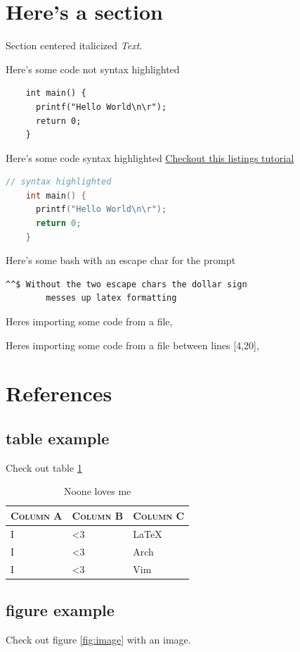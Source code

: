\documentclass[oneside,english,chapters]{smireport}
\providecommand{\tabularnewline}{\\}
\begin{document}
\section{Here's a section}
\begin{center}Section centered italicized \textit{Text}.\end{center}
Here's some code not syntax highlighted
\begin{verbatim}
    int main() {
      printf("Hello World\n\r");
      return 0;
    }
\end{verbatim}
Here's some code syntax highlighted
\href{https://www.overleaf.com/learn/latex/Code\_listing}{Checkout this listings tutorial}
\begin{lstlisting}[language=C]
    // syntax highlighted
    int main() {
      printf("Hello World\n\r");
      return 0;
    }
\end{lstlisting}
Here's some bash with an escape char for the prompt
\begin{lstlisting}[language=bash, escapechar=^]
    ^^$ Without the two escape chars the dollar sign
        messes up latex formatting
\end{lstlisting}
Heres importing some code from a file,

Heres importing some code from a file between lines [4,20],


\section{References}
\subsection{table example}
Check out table \ref{tab:uselesstable}

\begin{table}[H]
  \begin{tabular}{|>{\centering}p{}|>{\centering}p{}|>{\centering}p{}|}
    \hline
    \textbf{\textsc{Column A}} & \textbf{\textsc{Column B}} & \textbf{\textsc{Column C}}\tabularnewline
    \hline
    \hline
    I & <3 & LaTeX\tabularnewline
    \hline
    I & <3 & Arch\tabularnewline
    \hline
    I & <3 & Vim\tabularnewline
    \hline
  \end{tabular}
  \caption{Noone loves me}\label{tab:uselesstable}
\end{table}

\subsection{figure example}
Check out figure \ref{fig:image} with an image.
\end{document}

